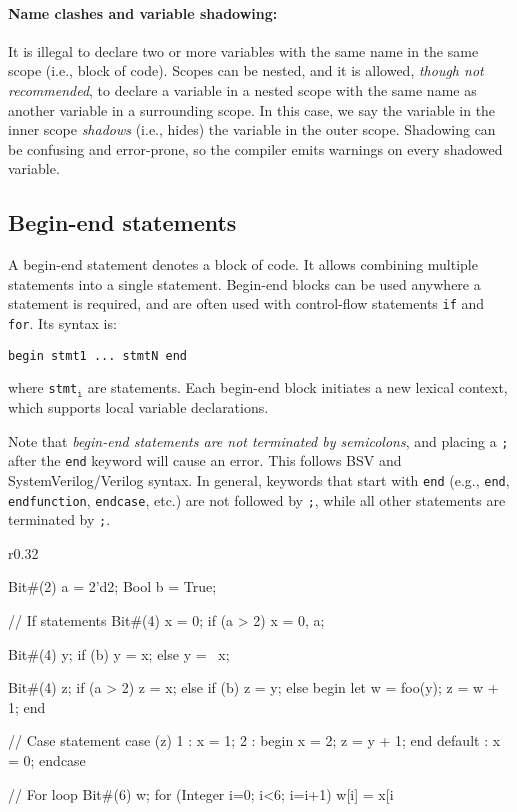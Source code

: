 \paragraph{Name clashes and variable shadowing:}
It is illegal to declare two or more variables with the same name in the same scope (i.e., block of code).
Scopes can be nested, and it is allowed, \emph{though not recommended},
to declare a variable in a nested scope with the same name as another variable in a surrounding scope.
In this case, we say the variable in the inner scope \emph{shadows} (i.e., hides) the variable in the outer scope.
Shadowing can be confusing and error-prone, so the compiler emits warnings on every shadowed variable.

\subsection{Begin-end statements}

A begin-end statement denotes a block of code. It allows combining multiple statements into a single statement.
Begin-end blocks can be used anywhere a statement is required, and are often used with control-flow
statements \verb|if| and \verb|for|. Its syntax is:
\begin{center}
\verb|begin stmt1 ... stmtN end|
\end{center}
where \verb|stmt|$_{\texttt{i}}$ are statements. Each begin-end block initiates a new lexical context,
which supports local variable declarations.

Note that \emph{begin-end statements are not terminated by semicolons},
and placing a \verb|;| after the \verb|end| keyword will cause an error.
This follows BSV and SystemVerilog/Verilog syntax.
In general, keywords that start with \verb|end| (e.g., \verb|end|, \verb|endfunction|, \verb|endcase|, etc.)
are not followed by \verb|;|, while all other statements are terminated by \verb|;|.

\begin{wrapfigure}{r}{0.32\columnwidth}
\vspace{-4.5em}
\begin{mscode}
Bit#(2) a = 2'd2;
Bool b = True;

// If statements
Bit#(4) x = 0;
if (a > 2) x = {0, a};

Bit#(4) y;
if (b) y = x;
else y = ~x;

Bit#(4) z;
if (a > 2) z = x;
else if (b) z = y;
else begin
  let w = foo(y);
  z = w + 1;
end

// Case statement
case (z)
  1 : x = 1;
  2 : begin
        x = 2;
        z = y + 1;
      end
  default : x = 0;
endcase

// For loop
Bit#(6) w;
for (Integer i=0; i<6; i=i+1)
  w[i] = x[i %
\end{mscode}
\vspace{-7.5em}
\end{wrapfigure}

